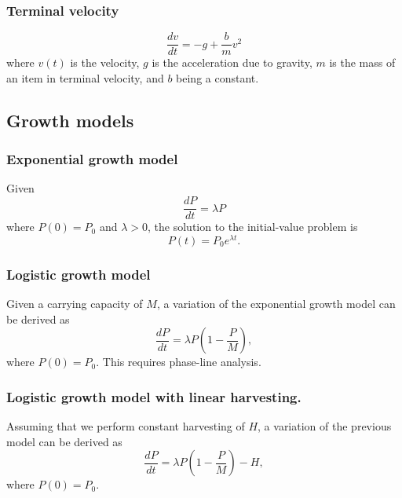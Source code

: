\documentclass[main.tex]{subfiles}
\begin{document}
	\subsubsection*{Terminal velocity}
	\[\frac{dv}{dt} = -g + \frac{b}{m} v^2\]
	where \(v(t)\) is the velocity, \(g\) is the acceleration due to gravity, \(m\) is the mass of an item in terminal velocity, and \(b\) being a constant.

	\subsection*{Growth models}
	\subsubsection*{Exponential growth model}
	Given \[\frac{dP}{dt} = \lambda P\] where \(P(0) = P_0\) and \(\lambda > 0\), the solution to the initial-value problem is
	\[P(t) = P_0e^{\lambda t}.\]

	\subsubsection*{Logistic growth model}
	Given a carrying capacity of \(M\), a variation of the exponential growth model can be derived as \[\frac{dP}{dt} = \lambda P \left(1 - \frac{P}{M}\right),\] where \(P(0) = P_0.\) This requires phase-line analysis.

	\subsubsection*{Logistic growth model with linear harvesting.}
	Assuming that we perform constant harvesting of \(H\), a variation of the previous model can be derived as \[\frac{dP}{dt} = \lambda P \left(1 - \frac{P}{M}\right) - H,\] where \(P(0) = P_0.\)


\ifSubfilesClassLoaded{%
\end{multicols}
}{}
\end{document}
